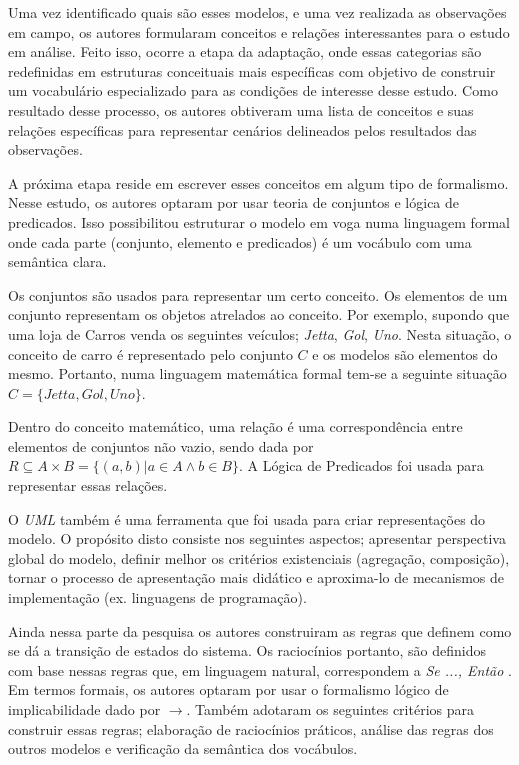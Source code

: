 Uma vez identificado quais são esses modelos, e uma vez realizada as observações em campo, os autores formularam conceitos e relações interessantes para o estudo em análise. Feito isso, ocorre a etapa da adaptação, onde essas categorias são redefinidas em estruturas conceituais mais específicas com objetivo de construir um vocabulário especializado para as condições de interesse desse estudo. Como resultado desse processo, os autores obtiveram uma lista de conceitos e suas relações específicas para representar cenários delineados pelos resultados das observações. 

A próxima etapa reside em escrever esses conceitos em algum tipo de formalismo. Nesse estudo, os autores optaram por usar teoria de conjuntos e lógica de predicados. Isso possibilitou estruturar o modelo em voga numa linguagem formal onde cada parte (conjunto, elemento e predicados) é um vocábulo com uma semântica clara. 

Os conjuntos são usados para representar um certo conceito. Os elementos de um conjunto representam os objetos atrelados ao conceito. Por exemplo, supondo que uma loja de Carros venda os seguintes veículos; \textit{Jetta}, \textit{Gol}, \textit{Uno}.
Nesta situação, o conceito de carro é representado pelo conjunto $C$ e os modelos são elementos do mesmo. Portanto, numa linguagem matemática formal tem-se a seguinte situação $C = \{Jetta,Gol,Uno\}$. 

Dentro do conceito matemático, uma relação é uma correspondência entre elementos de conjuntos não vazio, sendo dada por $R \subseteq  A \times B = \{(a,b)| a \in A \wedge b \in B \}$. A Lógica de Predicados foi usada para representar essas
relações.

O \textit{UML} também é uma ferramenta que foi usada para criar representações do modelo. O propósito disto consiste nos seguintes aspectos; apresentar perspectiva global do modelo, definir melhor os critérios existenciais (agregação, composição),
tornar o processo de apresentação mais didático e aproxima-lo de mecanismos de implementação (ex. linguagens de programação). 

Ainda nessa parte da pesquisa os autores construiram as regras que definem como se dá a transição de estados do sistema. Os raciocínios portanto, são definidos com base nessas regras que, em linguagem natural, correspondem a \textit{Se ..., Então }. Em termos formais, os autores optaram por usar o formalismo lógico de implicabilidade dado por $\to$. Também adotaram os seguintes critérios para construir essas regras; elaboração de raciocínios práticos, análise das regras dos outros modelos e verificação da semântica dos vocábulos.